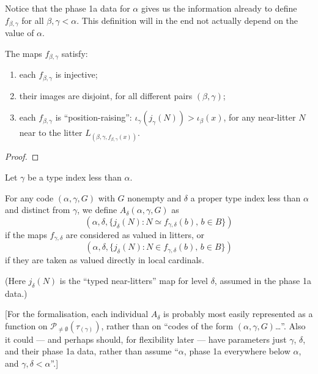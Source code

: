 Notice that the phase 1a data for $\alpha$ gives us the information already to define $f_{\beta,\gamma}$ for all $\beta, \gamma < \alpha$.  This definition will in the end not actually depend on the value of $\alpha$.

\begin{lemma}
  \label{lem:f-map-properties}
  \leanok
  The maps $f_{\beta,\gamma}$ satisfy:
  \begin{enumerate}
  \item each $f_{\beta,\gamma}$ is injective;
  \item their images are disjoint, for all different pairs $(\beta,\gamma)$;
  \item each $f_{\beta,\gamma}$ is “position-raising”: $\iota_\gamma(j_\gamma(N)) > \iota_\beta(x)$, for any near-litter $N$ near to the litter $L_{(\beta,\gamma,f_{\beta,\gamma}(x))}$.
  \end{enumerate}
\end{lemma}
\begin{proof}\leanok\end{proof}

\begin{definition}
\label {def:a-map}
\leanok
Let $\gamma$ be a type index less than $\alpha$.

For any code $(\alpha,\gamma,G)$ with $G$ nonempty and $\delta$ a proper type index less than $\alpha$ and distinct from $\gamma$, we define
$A_\delta(\alpha,\gamma,G)$ as
$$(\alpha,\delta,\{ j_\delta(N) : N \simeq f_{\gamma,\delta}(b),\, b \in B \})$$
if the maps $f_{\gamma,\delta}$ are considered as valued in litters, or
$$(\alpha,\delta,\{ j_\delta(N) : N \in f_{\gamma,\delta}(b),\, b \in B \})$$
if they are taken as valued directly in local cardinals.

(Here $j_\delta(N)$ is the “typed near-litters” map for level $\delta$, assumed in the phase 1a data.)

[For the formalisation, each individual $A_\delta$ is probably most easily represented as a function on $\mathcal{P}_{\neq \emptyset}(\tau_(\gamma))$, rather than on “codes of the form $(\alpha,\gamma,G)$…”.  Also it could — and perhaps should, for flexibility later — have parameters just $\gamma$, $\delta$, and their phase 1a data, rather than assume “$\alpha$, phase 1a everywhere below $\alpha$, and $\gamma,\delta < \alpha$”.]
\end{definition}

